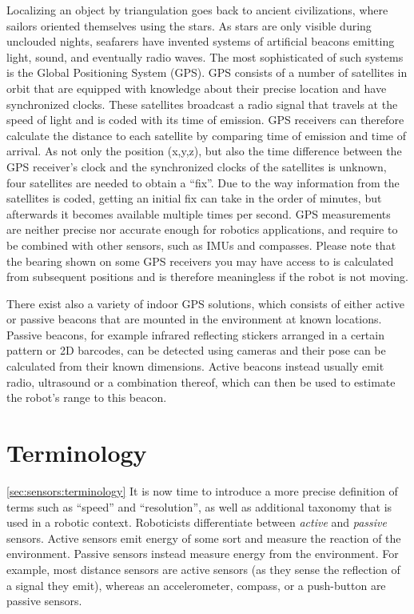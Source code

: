 Localizing an object by triangulation goes back to ancient civilizations, where sailors oriented themselves using the stars. As stars are only visible during unclouded nights, seafarers have invented systems of artificial beacons emitting light, sound, and eventually radio waves. The most sophisticated of such systems is the Global Positioning System (GPS). GPS consists of a number of satellites in orbit that are equipped with knowledge about their precise location and have synchronized clocks. These satellites broadcast a radio signal that travels at the speed of light and is coded with its time of emission. GPS receivers can therefore calculate the distance to each satellite by comparing time of emission and time of arrival. As not only the position (x,y,z), but also the time difference between the GPS receiver's clock and the synchronized clocks of the satellites is unknown, four satellites are needed to obtain a ``fix''. Due to the way information from the satellites is coded, getting an initial fix can take in the order of minutes, but afterwards it becomes available multiple times per second. GPS measurements are neither precise nor accurate enough for robotics applications, and require to be combined with other sensors, such as IMUs and compasses. Please note that the bearing shown on some GPS receivers you may have access to is calculated from subsequent positions and is therefore meaningless if the robot is not moving.

There exist also a variety of indoor GPS solutions, which consists of either active or passive beacons that are mounted in the environment at known locations. Passive beacons, for example infrared reflecting stickers arranged in a certain pattern or 2D barcodes, can be detected using cameras and their pose can be calculated from their known dimensions. Active beacons instead usually emit radio, ultrasound or a combination thereof, which can then be used to estimate the robot's range to this beacon.

\section{Terminology}\cref{sec:sensors:terminology}
It is now time to introduce a more precise definition of terms such as ``speed'' and ``resolution'', as well as additional taxonomy that is used in a robotic context.
%
Roboticists differentiate between \textsl{active} and \textsl{passive} sensors. Active sensors  emit energy of some sort and measure the reaction of the environment. Passive sensors  instead measure energy from the environment. For example, most distance sensors are active sensors (as they sense the reflection of a signal they emit), whereas an accelerometer, compass, or a push-button are passive sensors.

